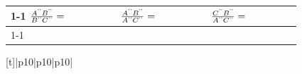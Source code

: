 {{\begin{tabular*}{\mytablewidth}[t]{|p{10\mystarwidth}|p{10\mystarwidth}|p{10\mystarwidth}|}
     \tabularnewline\cline{1-1}\cline{2-2}\cline{3-3}
                $\frac{{A}^{\text{'}\text{'}}{B}^{\text{'}\text{'}}}{{B}^{\text{'}\text{'}}{C}^{\text{'}\text{'}}}=\phantom{\rule{42.67912pt}{0ex}}$
               &
                $\frac{{A}^{\text{'}\text{'}}{B}^{\text{'}\text{'}}}{{A}^{\text{'}\text{'}}{C}^{\text{'}\text{'}}}=\phantom{\rule{42.67912pt}{0ex}}$
               &
                $\frac{{C}^{\text{'}\text{'}}{B}^{\text{'}\text{'}}}{{A}^{\text{'}\text{'}}{C}^{\text{'}\text{'}}}=\phantom{\rule{42.67912pt}{0ex}}$
     \tabularnewline\cline{1-1}\cline{2-2}\cline{3-3}
    \end{tabular*}} %
        \addtolength{\mytableboxheight}{\mytableboxdepth}
        \begin{center}
      \label{m39405*id78604}
    \noindent
      \tablelasttail{}
      \begin{xtabular*}{\mytablewidth}[t]{|p{10\mystarwidth}|p{10\mystarwidth}|p{10\mystarwidth}|}\hline

\end{xtabular*}
\end{center}}
